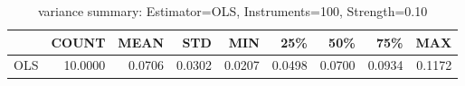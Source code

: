 \begin{table}[ht]
\centering
\caption{variance summary: Estimator=OLS, Instruments=100, Strength=0.10}
\begin{tabular}{lrrrrrrrr}
\toprule
 & COUNT & MEAN & STD & MIN & 25\% & 50\% & 75\% & MAX \\
\midrule
OLS & 10.0000 & 0.0706 & 0.0302 & 0.0207 & 0.0498 & 0.0700 & 0.0934 & 0.1172 \\
\bottomrule
\end{tabular}
\end{table}
